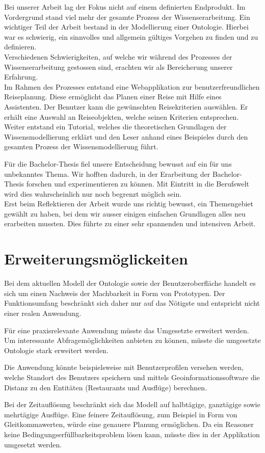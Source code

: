 Bei unserer Arbeit lag der Fokus nicht auf einem definierten Endprodukt. Im Vordergrund stand viel mehr der gesamte Prozess der Wissenserarbeitung. Ein wichtiger Teil der Arbeit bestand in der Modellierung einer Ontologie. Hierbei war es schwierig, ein sinnvolles und allgemein gültiges Vorgehen zu finden und zu definieren.\\
Verschiedenen Schwierigkeiten, auf welche wir während des Prozesses der Wissenserarbeitung gestossen sind, erachten wir als Bereicherung unserer Erfahrung.\\
Im Rahmen des Prozesses entstand eine Webapplikation zur benutzerfreundlichen Reiseplanung. Diese ermöglicht das Planen einer Reise mit Hilfe eines Assistenten. Der Benutzer kann die gewünschten Reisekriterien auswählen. Er erhält eine Auswahl an Reiseobjekten, welche seinen Kriterien entsprechen.\\
Weiter entstand ein Tutorial, welches die theoretischen Grundlagen der Wissensmodellierung erklärt und den Leser anhand eines Beispieles durch den gesamten Prozess der Wissensmodellierung führt.

Für die Bachelor-Thesis fiel unsere Entscheidung bewusst auf ein für uns unbekanntes Thema. Wir hofften dadurch, in der Erarbeitung der Bachelor-Thesis forschen und experimentieren zu können. Mit Eintritt in die Berufswelt wird dies wahrscheinlich nur noch begrenzt möglich sein.\\
Erst beim Reflektieren der Arbeit wurde uns richtig bewusst, ein Themengebiet gewählt zu haben, bei dem wir ausser einigen einfachen Grundlagen alles neu erarbeiten mussten. Dies führte zu einer sehr spannenden und intensiven Arbeit.


\section{Erweiterungsmöglickeiten}
\label{sec:fazit_subchap}
Bei dem aktuellen Modell der Ontologie sowie der Benutzeroberfläche handelt es sich um einen Nachweis der Machbarkeit in Form von Prototypen. Der Funktionsumfang beschränkt sich daher nur auf das Nötigste und entspricht nicht einer realen Anwendung.

Für eine praxisrelevante Anwendung müsste das Umgesetzte erweitert werden. Um interessante Abfragemöglichkeiten anbieten zu können, müsste die umgesetzte Ontologie stark erweitert werden.

Die Anwendung könnte beispielsweise mit Benutzerprofilen versehen werden, welche Standort des Benutzers speichern und mittels Geoinformationssoftware die Distanz zu den Entitäten (Restaurants und Ausflüge) berechnen.

Bei der Zeitauflösung beschränkt sich das Modell auf halbtägige, ganztägige sowie mehrtägige Ausflüge. Eine feinere Zeitauflösung, zum Beispiel in Form von Gleitkommawerten, würde eine genauere Planung ermöglichen. Da ein Reasoner keine Bedingungserfüllbarkeitsproblem lösen kann, müsste dies in der Applikation umgesetzt werden.
